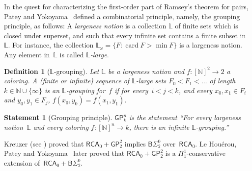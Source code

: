\documentclass{article}
\numberwithin{theorem}{section}
\newtheorem{definition}[theorem]{Definition}
\newtheorem{statement}[theorem]{Statement}
\def\LL{\mathbb{L}}
\newcommand{\BSig}{\mathsf{B}\Sigma^0}
\newcommand{\RCA}[0]{\mathsf{RCA}}
\newcommand{\GP}{\mathsf{GP}}
\newcommand{\SGP}{\mathsf{SGP}}
\newcommand{\NN}[0]{\mathbb{N}}
\newcommand{\card}{\operatorname{card}}
\def\qt#1{``#1''}%
\def\qt#1{``#1''}%
\begin{document}
In the quest for characterizing the first-order part of Ramsey's theorem for pairs, Patey and Yokoyama~\cite{patey2018proof} defined a combinatorial principle, namely, the grouping principle, as follows:
A \emph{largeness notion} is a collection $\LL$ of finite sets which is closed under superset, and such that every infinite set contains a finite subset in~$\LL$. For instance, the collection $\LL_\omega = \{ F : \card F > \min F \}$ is a largeness notion. Any element in~$\LL$ is called \emph{$\LL$-large}.

\begin{definition}[$\LL$-grouping]
Let $\LL$ be a largeness notion and $f : [\mathbb{N}]^2 \to 2$ a coloring.
A (finite or infinite) sequence of $\LL$-large sets $F_0 < F_1 < \dots$ of length $k \in \NN \cup \{\infty\}$ is an \emph{$\LL$-grouping} for~$f$ if for every~$i < j < k$, and every $x_0, x_1 \in F_i$ and $y_0, y_1 \in F_j$, $f(x_0, y_0) = f(x_1, y_1)$.
\end{definition}


\begin{statement}[Grouping principle]
$\GP^n_k$ is the statement \qt{For every largeness notion~$\LL$ and every coloring $f : [\NN]^n \to k$, there is an infinite $\LL$-grouping.}
\end{statement}

Kreuzer (see \cite[Theorem 9.1]{patey2018proof}) proved that $\RCA_0 + \GP^2_2$ implies $\BSig_2$ over~$\RCA_0$.
Le Houérou, Patey and Yokoyama~\cite{houerou2023conservation} later proved that $\RCA_0 + \GP^2_2$ is a $\Pi^1_1$-conservative extension of~$\RCA_0 + \BSig_2$.
\end{document}
